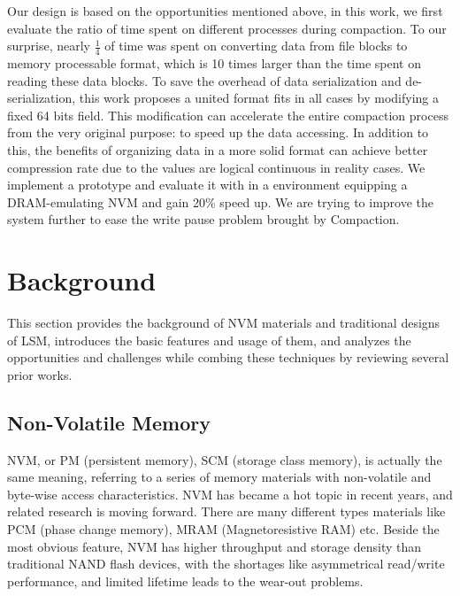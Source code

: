 Our design is based on the opportunities mentioned above, in this work, we first evaluate the ratio of time spent on different processes during compaction. To our surprise, nearly $\frac{1}{4}$ of time was spent on converting data from file blocks to memory processable format, which is 10 times larger than the time spent on reading these data blocks. To save the overhead of data serialization and de-serialization, this work proposes a united format fits in all cases by modifying a fixed 64 bits field. This modification can accelerate the entire compaction process from the very original purpose: to speed up the data accessing. In addition to this, the benefits of organizing data in a more solid format can achieve better compression rate due to the values are logical continuous in reality cases. We implement a prototype and evaluate it with in a environment equipping a DRAM-emulating NVM and gain 20\% speed up. We are trying to improve the system further to ease the write pause problem brought by Compaction.


\section{Background}
This section provides the background of NVM materials and traditional designs of LSM, introduces the basic features and usage of them, and analyzes the opportunities and challenges while combing these techniques by reviewing several prior works.

\subsection{Non-Volatile Memory}
NVM, or PM (persistent memory), SCM (storage class memory), is actually the same meaning, referring to a series of memory materials with non-volatile and byte-wise access characteristics. NVM has became a hot topic in recent years, and related research is moving forward. There are many different types materials like PCM (phase change memory), MRAM (Magnetoresistive RAM) etc. Beside the most obvious feature, NVM has higher throughput and storage density than traditional NAND flash devices, with the shortages like asymmetrical read/write performance, and limited lifetime leads to the wear-out problems.



